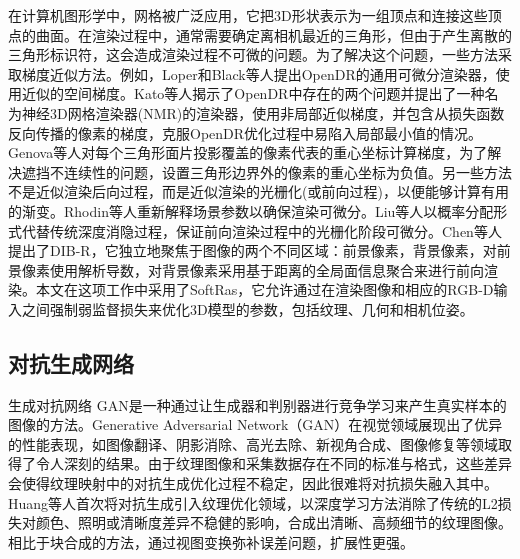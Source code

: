 在计算机图形学中，网格被广泛应用，它把3D形状表示为一组顶点和连接这些顶点的曲面。在渲染过程中，通常需要确定离相机最近的三角形，但由于产生离散的三角形标识符，这会造成渲染过程不可微的问题。为了解决这个问题，一些方法采取梯度近似方法。例如，Loper和Black等人提出OpenDR的通用可微分渲染器，使用近似的空间梯度。Kato等人揭示了OpenDR中存在的两个问题并提出了一种名为神经3D网格渲染器(NMR)的渲染器，使用非局部近似梯度，并包含从损失函数反向传播的像素的梯度，克服OpenDR优化过程中易陷入局部最小值的情况。Genova等人对每个三角形面片投影覆盖的像素代表的重心坐标计算梯度，为了解决遮挡不连续性的问题，设置三角形边界外的像素的重心坐标为负值。另一些方法不是近似渲染后向过程，而是近似渲染的光栅化(或前向过程)，以便能够计算有用的渐变。Rhodin等人重新解释场景参数以确保渲染可微分。Liu等人以概率分配形式代替传统深度消隐过程，保证前向渲染过程中的光栅化阶段可微分。Chen等人提出了DIB-R，它独立地聚焦于图像的两个不同区域：前景像素，背景像素，对前景像素使用解析导数，对背景像素采用基于距离的全局面信息聚合来进行前向渲染。本文在这项工作中采用了SoftRas，它允许通过在渲染图像和相应的RGB-D输入之间强制弱监督损失来优化3D模型的参数，包括纹理、几何和相机位姿。
\subsection{对抗生成网络}
生成对抗网络 GAN是一种通过让生成器和判别器进行竞争学习来产生真实样本的图像的方法。Generative Adversarial Network（GAN）在视觉领域展现出了优异的性能表现，如图像翻译、阴影消除、高光去除、新视角合成、图像修复等领域取得了令人深刻的结果。由于纹理图像和采集数据存在不同的标准与格式，这些差异会使得纹理映射中的对抗生成优化过程不稳定，因此很难将对抗损失融入其中。Huang等人首次将对抗生成引入纹理优化领域，以深度学习方法消除了传统的L2损失对颜色、照明或清晰度差异不稳健的影响，合成出清晰、高频细节的纹理图像。相比于块合成的方法，通过视图变换弥补误差问题，扩展性更强。


